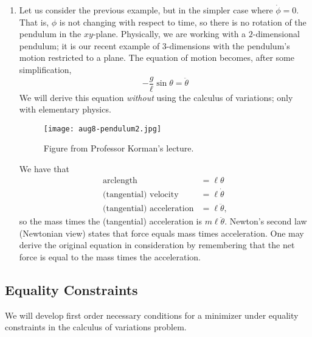 \documentclass[11pt]{book}
\begin{document}
\begin{enumerate}
\item
Let us consider the previous example, but in the simpler case where $\dot{\phi} = 0$. That is, $\phi$ is not changing with respect to time, so there is no rotation of the pendulum in the $xy$-plane. Physically, we are working with a $2$-dimensional pendulum; it is our recent example of $3$-dimensions with the pendulum's motion restricted to a plane. The equation of motion becomes, after some simplification,
\[
-\frac{g}{\ell} \sin \theta = \ddot{\theta}
\]
We will derive this equation \emph{without} using the calculus of variations; only with elementary physics.
\begin{figure}[H]
\texttt{[image: aug8-pendulum2.jpg]}
\centering
\caption{Figure from Professor Korman's lecture.}
\end{figure}
We have that
\begin{align*}
\text{arclength} &= \ell \theta \\
\text{(tangential) velocity} &= \ell \dot{\theta} \\
\text{(tangential) acceleration} &= \ell \ddot{\theta},
\end{align*}
so the mass times the (tangential) acceleration is $m \ell \ddot{\theta}$. Newton's second law (Newtonian view) states that force equals mass times acceleration. One may derive the original equation in consideration by remembering that the net force is equal to the mass times the acceleration.
\end{enumerate}

\subsection{Equality Constraints}

We will develop first order necessary conditions for a minimizer under equality constraints in the calculus of variations problem.
\end{document}
